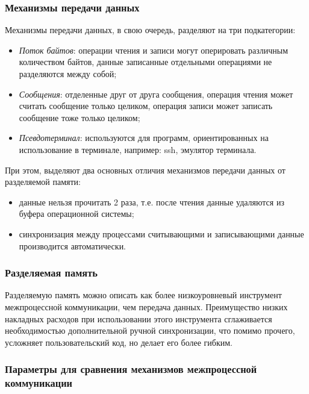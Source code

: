 \documentclass[14pt, russian]{scrartcl}
\begin{document}
\subsubsection{Механизмы передачи данных}

Механизмы передачи данных, в свою очередь, разделяют на три подкатегории:

\begin{itemize}
  \item \emph{Поток байтов}: операции чтения и записи могут оперировать
        различным количеством байтов, данные записанные отдельными операциями не
        разделяются между собой;
  \item \emph{Сообщения}: отделенные друг от друга сообщения, операция чтения
        может считать сообщение только целиком, операция записи может записать
        сообщение тоже только целиком;
  \item \emph{Псевдотерминал}: используются для программ, ориентированных на
        использование в терминале, например: ssh, эмулятор терминала.
\end{itemize}

При этом, выделяют два основных отличия механизмов передачи данных от
разделяемой памяти:

\begin{itemize}
  \item данные нельзя прочитать 2 раза, т.е. после чтения данные удаляются из
        буфера операционной системы;
  \item синхронизация между процессами считывающими и записывающими данные
        производится автоматически.
\end{itemize}

\subsubsection{Разделяемая память}

Разделяемую память можно описать как более низкоуровневый инструмент
межпроцессной коммуникации, чем передача данных. Преимущество низких накладных
расходов при использовании этого инструмента сглаживается необходимостью
дополнительной ручной синхронизации, что помимо прочего, усложняет
пользовательский код, но делает его более гибким.

\subsubsection{Параметры для сравнения механизмов межпроцессной коммуникации}
\end{document}
